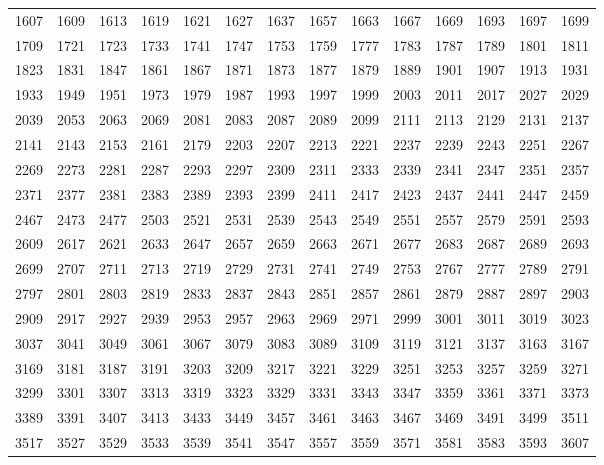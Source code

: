 \documentclass[10pt, a4paper]{article}
\begin{document}
\begin{center}
\begin{longtable}{c c c c c c c c c c c c c c}
        1607 & 1609 & 1613 & 1619 & 1621 & 1627 & 1637 & 1657 & 1663 & 1667 & 1669 & 1693 & 1697 & 1699 \\
        1709 & 1721 & 1723 & 1733 & 1741 & 1747 & 1753 & 1759 & 1777 & 1783 & 1787 & 1789 & 1801 & 1811 \\
        \hline
        1823 & 1831 & 1847 & 1861 & 1867 & 1871 & 1873 & 1877 & 1879 & 1889 & 1901 & 1907 & 1913 & 1931 \\
        1933 & 1949 & 1951 & 1973 & 1979 & 1987 & 1993 & 1997 & 1999 & 2003 & 2011 & 2017 & 2027 & 2029 \\
        2039 & 2053 & 2063 & 2069 & 2081 & 2083 & 2087 & 2089 & 2099 & 2111 & 2113 & 2129 & 2131 & 2137 \\
        2141 & 2143 & 2153 & 2161 & 2179 & 2203 & 2207 & 2213 & 2221 & 2237 & 2239 & 2243 & 2251 & 2267 \\
        2269 & 2273 & 2281 & 2287 & 2293 & 2297 & 2309 & 2311 & 2333 & 2339 & 2341 & 2347 & 2351 & 2357 \\
        2371 & 2377 & 2381 & 2383 & 2389 & 2393 & 2399 & 2411 & 2417 & 2423 & 2437 & 2441 & 2447 & 2459 \\
        2467 & 2473 & 2477 & 2503 & 2521 & 2531 & 2539 & 2543 & 2549 & 2551 & 2557 & 2579 & 2591 & 2593 \\
        2609 & 2617 & 2621 & 2633 & 2647 & 2657 & 2659 & 2663 & 2671 & 2677 & 2683 & 2687 & 2689 & 2693 \\
        2699 & 2707 & 2711 & 2713 & 2719 & 2729 & 2731 & 2741 & 2749 & 2753 & 2767 & 2777 & 2789 & 2791 \\
        2797 & 2801 & 2803 & 2819 & 2833 & 2837 & 2843 & 2851 & 2857 & 2861 & 2879 & 2887 & 2897 & 2903 \\
        \hline
        2909 & 2917 & 2927 & 2939 & 2953 & 2957 & 2963 & 2969 & 2971 & 2999 & 3001 & 3011 & 3019 & 3023 \\
        3037 & 3041 & 3049 & 3061 & 3067 & 3079 & 3083 & 3089 & 3109 & 3119 & 3121 & 3137 & 3163 & 3167 \\
        3169 & 3181 & 3187 & 3191 & 3203 & 3209 & 3217 & 3221 & 3229 & 3251 & 3253 & 3257 & 3259 & 3271 \\
        3299 & 3301 & 3307 & 3313 & 3319 & 3323 & 3329 & 3331 & 3343 & 3347 & 3359 & 3361 & 3371 & 3373 \\
        3389 & 3391 & 3407 & 3413 & 3433 & 3449 & 3457 & 3461 & 3463 & 3467 & 3469 & 3491 & 3499 & 3511 \\
        3517 & 3527 & 3529 & 3533 & 3539 & 3541 & 3547 & 3557 & 3559 & 3571 & 3581 & 3583 & 3593 & 3607 \\

\end{longtable}
\end{center}
\end{document}
